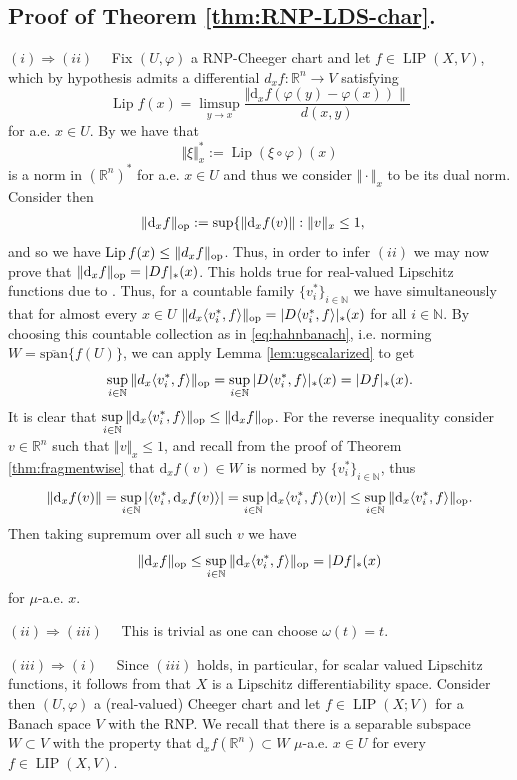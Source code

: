 \documentclass{amsart}
\numberwithin{equation}{section}
\newcommand{\R}{\mathbb{R}}
\newcommand{\N}{\mathbb{N}}
\newcommand{\Lip}{\operatorname{Lip}}
\newcommand{\LIP}{\operatorname{LIP}}
\newcommand{\ud}{\mathrm {d}}
\begin{document}
\subsection{Proof of Theorem \ref{thm:RNP-LDS-char}.}
\noindent$(i)\Rightarrow (ii)\quad$ Fix $(U,\varphi )$ a RNP-Cheeger chart and let $f\in \LIP (X,V)$, which by hypothesis admits a differential $d_xf:\R^n\rightarrow V$ satisfying
$$\Lip f(x)=\limsup_{y\to x}\frac{\Vert \ud_xf(\varphi (y)-\varphi (x))\|}{d(x,y)}$$
for a.e. $x\in U$. By \cite[Lemma 2.1]{bate2013differentiability} we have that
$$\Vert \xi \Vert^*_x:=\Lip (\xi \circ \varphi )(x)$$
is a norm in $(\R^n)^*$ for a.e. $x\in U$ and thus we consider $\Vert\cdot\Vert_x$ to be its dual norm. Consider then
\begin{align*}
	\Vert \ud_xf\Vert_{\rm op}&:=\sup \{ \Vert \ud_xf(v)\Vert:\Vert v\Vert_x\leq 1,
\end{align*}
and so we have $\Lip f(x)\leq \Vert d_xf\Vert_{\rm op}$. Thus, in order to infer $(ii)$ we may now prove that $\Vert \ud_xf\Vert_{\rm op}=|Df|_*(x)$. This holds true for real-valued Lipschitz functions due to \cite[Theorem 1.2]{tsd24}. Thus, for a countable family $\{ v_i^*\}_{i\in\N}$ we have simultaneously  that for almost every $x\in U$ $\Vert d_x\langle v_i^*,f\rangle \Vert_{\rm op}=|D\langle v_i^*,f\rangle |_*(x)$ for all $i\in\N$. By choosing this countable collection as in \eqref{eq:hahnbanach}, i.e. norming $W=\overline{\mathrm{span}}\{ f(U)\}$, we can apply Lemma \ref{lem:ugscalarized} to get
$$\sup_{i\in\N}\Vert d_x\langle v_i^*,f\rangle \Vert_{\rm op}=\sup_{i\in\N}|D\langle v_i^*,f\rangle |_*(x)=|Df|_*(x).$$
It is clear that $\displaystyle \sup_{i\in\N}\Vert \ud_x\langle v_i^*,f\rangle \Vert_{\rm op}\leq \Vert \ud_xf\Vert_{\rm op}$. For the reverse inequality consider $v\in\R^n$ such that $\Vert v\Vert_x\leq 1$, and recall from the proof of Theorem \ref{thm:fragmentwise} that $\ud_xf(v)\in W$ is normed by $\{ v_i^*\}_{i\in\N}$, thus
$$
\Vert \ud_xf(v)\Vert =\sup_{i\in\N}|\langle v_i^*,\ud_xf(v)\rangle|= \sup_{i\in\N}|\ud_x\langle v_i^*,f\rangle (v)|\leq \sup_{ i\in\N}\Vert \ud_x\langle v_i^*,f\rangle \Vert_{\rm op}.
$$
Then taking supremum over all such $v$ we have 
$$\Vert \ud_xf\Vert_{\rm op}\leq \displaystyle\sup_{ i\in\N}\Vert \ud_x\langle v_i^*,f\rangle \Vert_{\rm op}=|Df|_*(x)$$ for $\mu$-a.e. $x$.


\noindent$(ii)\Rightarrow (iii)\quad$ This is trivial as one can choose $\omega(t)=t$.



\noindent$(iii)\Rightarrow (i)\quad$ Since $(iii)$ holds, in particular, for scalar valued Lipschitz functions, it follows from \cite[Theorem 1.5]{tsd24} that $X$ is a Lipschitz differentiability space. Consider then $(U,\varphi )$ a (real-valued) Cheeger chart and let $f\in \LIP (X;V)$ for a Banach space $V$ with the RNP. We recall that there is a separable subspace $W\subset V$ with the property that $\ud_xf(\R^n)\subset W$ $\mu$-a.e. $x\in U$ for every $f\in \LIP(X,V)$.  
\end{document}
